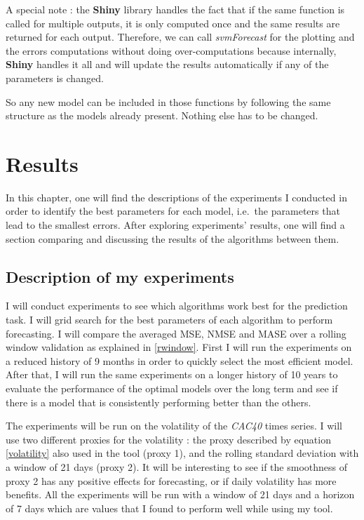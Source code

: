 \documentclass[11pt,a4paper,oneside]{book}
\begin{document}
A special note : the \textbf{Shiny} library handles the fact that if the same function is called for multiple outputs, it is only computed once and the same results are returned for each output. Therefore, we can call \textit{svmForecast} for the plotting and the errors computations without doing over-computations because internally, \textbf{Shiny} handles it all and will update the results automatically if any of the parameters is changed.

So any new model can be included in those functions by following the same structure as the models already present. Nothing else has to be changed.


\chapter{Results}\label{results}

In this chapter, one will find the descriptions of the experiments I conducted in order to identify the best parameters for each model, i.e.\ the parameters that lead to the smallest errors. After exploring experiments' results, one will find a section comparing and discussing the results of the algorithms between them.


\section{Description of my experiments}


I will conduct experiments to see which algorithms work best for the prediction task. I will grid search for the best parameters of each algorithm to perform forecasting. I will compare the averaged MSE, NMSE and MASE over a rolling window validation as explained in \ref{rwindow}. First I will run the experiments on a reduced history of 9 months in order to quickly select the most efficient model. After that, I will run the same experiments on a longer history of 10 years to evaluate the performance of the optimal models over the long term and see if there is a model that is consistently performing better than the others.

The experiments will be run on the volatility of the \textit{CAC40} times series. I will use two different proxies for the volatility : the proxy described by equation \ref{volatility} also used in the tool (proxy 1), and the rolling standard deviation with a window of 21 days (proxy 2). It will be interesting to see if the smoothness of proxy 2 has any positive effects for forecasting, or if daily volatility has more benefits. All the experiments will be run with a window of 21 days and a horizon of 7 days which are values that I found to perform well while using my tool.
\end{document}
